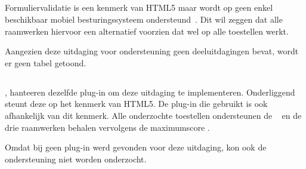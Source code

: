\subsection{}
\label{sec:evaluatie-ondersteuning-validatie}

Formuliervalidatie is een kenmerk van HTML5 maar wordt op geen enkel beschikbaar mobiel besturingssysteem ondersteund~\cite{Deveria2013}.
Dit wil zeggen dat alle raamwerken hiervoor een alternatief voorzien dat wel op alle toestellen werkt.

Aangezien deze uitdaging voor ondersteuning geen deeluitdagingen bevat, wordt er geen tabel getoond.

% 
% 
% 

\subsection{}
\label{sec:evaluatie-ondersteuning-handtekening}

\kendo{}, \jqm{} hanteeren dezelfde plug-in om deze uitdaging te implementeren.
Onderliggend steunt deze op het  kenmerk van HTML5.
De plug-in die \st{} gebruikt is ook afhankelijk van dit kenmerk.
Alle onderzochte toestellen ondersteunen de ~\cite{Deveria2013c} en de drie raamwerken behalen vervolgens de maximumscore . 

Omdat bij \lungo{} geen plug-in werd gevonden voor deze uitdaging, kon ook de ondersteuning niet worden onderzocht.

